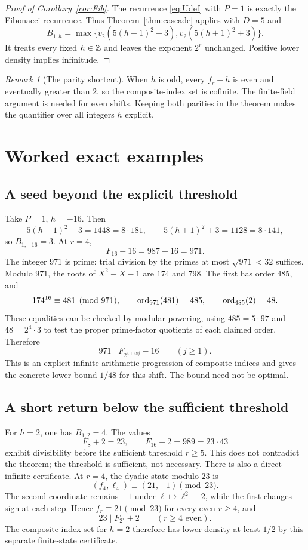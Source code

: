 \documentclass[11pt,a4paper]{article}
\theoremstyle{definition}\newtheorem{definition}[theorem]{Definition}
\theoremstyle{remark}\newtheorem{remark}[theorem]{Remark}
\begin{document}
\begin{proof}[Proof of Corollary~\ref{cor:Fib}]
The recurrence \eqref{eq:Udef} with $P=1$ is exactly the Fibonacci
recurrence. Thus Theorem~\ref{thm:cascade} applies with $D=5$ and
\[
 B_{1,h}=\max\{v_2(5(h-1)^2+3),v_2(5(h+1)^2+3)\}.
\]
It treats every fixed $h\in\mathbb Z$ and leaves the exponent $2^r$
unchanged. Positive lower density implies infinitude.
\end{proof}

\begin{remark}[The parity shortcut]
When $h$ is odd, every $f_r+h$ is even and eventually greater than
$2$, so the composite-index set is cofinite. The finite-field argument
is needed for even shifts. Keeping both parities in the theorem makes
the quantifier over all integers $h$ explicit.
\end{remark}

\section{Worked exact examples}
\subsection{A seed beyond the explicit threshold}
Take $P=1$, $h=-16$. Then
\[
 5(h-1)^2+3=1448=8\cdot181,
 \qquad5(h+1)^2+3=1128=8\cdot141,
\]
so $B_{1,-16}=3$. At $r=4$,
\[
 F_{16}-16=987-16=971.
\]
The integer $971$ is prime: trial division by the primes at most
$\sqrt{971}<32$ suffices. Modulo $971$, the roots of
$X^2-X-1$ are $174$ and $798$. The first has order $485$, and
\[
 174^{16}\equiv481\pmod{971},\qquad
 \operatorname{ord}_{971}(481)=485,\qquad\operatorname{ord}_{485}(2)=48.
\]
These equalities can be checked by modular powering, using
$485=5\cdot97$ and $48=2^4\cdot3$ to test the proper prime-factor
quotients of each claimed order. Therefore
\begin{equation}\label{eq:971}
 971\mid F_{2^{4+48j}}-16\qquad(j\ge1).
\end{equation}
This is an explicit infinite arithmetic progression of composite
indices and gives the concrete lower bound $1/48$ for this shift.
The bound need not be optimal.

\subsection{A short return below the sufficient threshold}
For $h=2$, one has $B_{1,2}=4$. The values
\[
 F_8+2=23,\qquad F_{16}+2=989=23\cdot43
\]
exhibit divisibility before the sufficient threshold $r\ge5$.
This does not contradict the theorem; the threshold is sufficient,
not necessary. There is also a direct infinite certificate. At $r=4$,
the dyadic state modulo $23$ is
\[
 (f_4,\ell_4)\equiv(21,-1)\pmod{23}.
\]
The second coordinate remains $-1$ under
$\ell\mapsto\ell^2-2$, while the first changes sign at each step.
Hence $f_r\equiv21\pmod{23}$ for every even $r\ge4$, and
\[
 23\mid F_{2^r}+2\qquad(r\ge4\text{ even}).
\]
The composite-index set for $h=2$ therefore has lower density at least
$1/2$ by this separate finite-state certificate.
\end{document}
